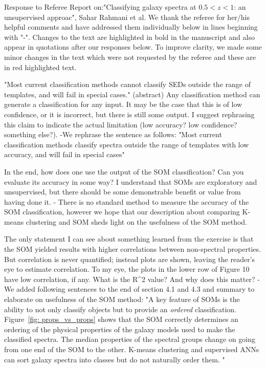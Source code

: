 Response to Referee Report on:"Classifying galaxy spectra at $0.5<z<1$: an unsupervised approac", Sahar Rahmani et al. 
We thank the referee for her/his helpful comments and have addressed them individually below in lines beginning with "-". Changes to the text are highlighted in bold in the manuscript and also appear in quotations after our responses below. To improve clarity, we made some minor changes in the text which were not requested by the referee and these are in red highlighted text. 

"Most current classification methods cannot classify SEDs outside the range of templates, and will fail in special cases." (abstract)
Any classification method can generate a classification for any input.  It may be the case that this is of low confidence, or it is incorrect, but there is still some output.  I suggest rephrasing this claim to indicate the actual limitation (low accuracy? low confidence? something else?).
	-We rephrase the sentence as follows:
	"Most current classification methods classify spectra outside the
		range of templates with low accuracy, and will fail in special cases"

In the end, how does one use the output of the SOM classification? Can you evaluate its accuracy in some way?  I understand that SOMs are exploratory and unsupervised, but there should be some demonstrable benefit or value from having done it.
- There is no standard method to measure the accuracy of the SOM classification, however we hope that our description about comparing K-means clustering and SOM sheds light on the usefulness of the SOM method.


The only statement I can see about something learned from the exercise is that the SOM yielded results with higher correlations between non-spectral properties.  But correlation is never quantified; instead plots are shown, leaving the reader's eye to estimate correlation.  To my eye, the plots in the lower row of Figure 10 have low correlation, if any.  What is the R^2 value?  And why does this matter? 
- We added following sentences to the end of section 4.1 and 4.3 and summary to elaborate on usefulness of the SOM method:
	"A key feature of SOMs is the ability to not only classify objects but to provide an {\em ordered} classification. Figure~\ref{fig: props_vs_props} shows that the SOM correctly determines an ordering of the physical properties of the galaxy models used to make the classified spectra. The median properties of the spectral groups change on going from one end of the SOM to the other.
	 K-means clustering and supervised ANNs can sort galaxy spectra into classes but do not naturally order them. "
	 
